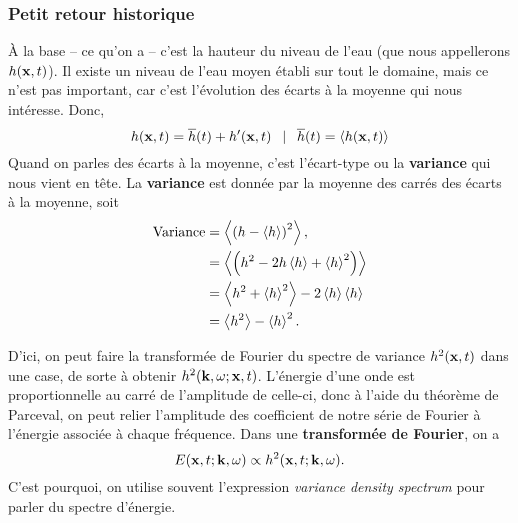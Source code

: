 \documentclass[10pt]{article}
\numberwithin{equation}{section}
\begin{document}
\subsubsection{Petit retour historique}
\label{sec:org4a6db0b}

À la base -- ce qu'on a -- c'est la hauteur du niveau de l'eau (que nous appellerons \(h(\vb{x},t)\)).
Il existe un niveau de l'eau moyen établi sur tout le domaine, mais ce n'est pas important, car c'est l'évolution des écarts à la moyenne qui nous intéresse.
Donc, 
\begin{equation}
   h(\vb{x},t) = \overline{h}(t) + h'(\vb{x},t) \enskip\mid\enskip \overline{h}(t) = \expval{h(\vb{x},t)}
\end{equation}
Quand on parles des écarts à la moyenne, c'est l'écart-type ou la \textbf{variance} qui nous vient en tête. 
La \textbf{variance} est donnée par la moyenne des carrés des écarts à la moyenne, soit
\begin{align}
   \mathrm{Variance} &= \expval{\qty(h - \expval{h})^2},\nonumber\\
   &= \expval{\qty(h^2 -2h\expval{h} + \expval{h}^2)}\\
   &= \expval{h^2 + \expval{h}^2} -2 \expval{h}\expval{h}\\
   &= \expval{h^2} - \expval{h}^2.
\end{align}

D'ici, on peut faire la transformée de Fourier du spectre de variance \(h^2(\vb{x},t)\) dans une case, de sorte à obtenir \(h^2(\vb{k}, \omega; \vb{x},t)\).
L'énergie d'une onde est proportionnelle au carré de l'amplitude de celle-ci, donc à l'aide du théorème de Parceval, on peut relier l'amplitude des coefficient de notre série de Fourier à l'énergie associée à chaque fréquence.
Dans une \textbf{transformée de Fourier}, on a 
\begin{equation}
   E(\vb{x},t; \vb{k},\omega) \propto h^2(\vb{x},t; \vb{k}, \omega).
\end{equation}
C'est pourquoi, on utilise souvent l'expression \emph{variance density spectrum} pour parler du spectre d'énergie.
\end{document}
